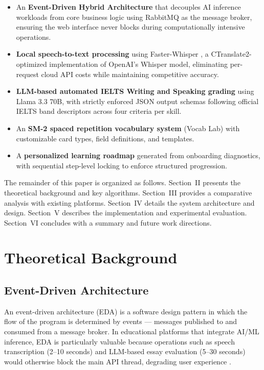 \documentclass[conference]{IEEEtran}
\begin{document}
\begin{itemize}
    \item An \textbf{Event-Driven Hybrid Architecture} that decouples AI inference workloads from core business logic using RabbitMQ as the message broker, ensuring the web interface never blocks during computationally intensive operations.
    \item \textbf{Local speech-to-text processing} using Faster-Whisper \cite{faster_whisper}, a CTranslate2-optimized implementation of OpenAI's Whisper model, eliminating per-request cloud API costs while maintaining competitive accuracy.
    \item \textbf{LLM-based automated IELTS Writing and Speaking grading} using Llama 3.3 70B, with strictly enforced JSON output schemas following official IELTS band descriptors across four criteria per skill.
    \item An \textbf{SM-2 spaced repetition vocabulary system} (Vocab Lab) with customizable card types, field definitions, and templates.
    \item A \textbf{personalized learning roadmap} generated from onboarding diagnostics, with sequential step-level locking to enforce structured progression.
\end{itemize}

The remainder of this paper is organized as follows. Section~II presents the theoretical background and key algorithms. Section~III provides a comparative analysis with existing platforms. Section~IV details the system architecture and design. Section~V describes the implementation and experimental evaluation. Section~VI concludes with a summary and future work directions.

\section{Theoretical Background}

\subsection{Event-Driven Architecture}
An event-driven architecture (EDA) is a software design pattern in which the flow of the program is determined by events --- messages published to and consumed from a message broker. In educational platforms that integrate AI/ML inference, EDA is particularly valuable because operations such as speech transcription (2--10 seconds) and LLM-based essay evaluation (5--30 seconds) would otherwise block the main API thread, degrading user experience \cite{richards_arch}.
\end{document}
